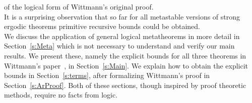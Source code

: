 of the logical form of Wittmann's original proof.\\
It is a surprising observation that so far for all metastable versions of strong ergodic theorems
primitive recursive bounds could be obtained.\\ 
We discuss the application of general logical metatheorems in more detail in Section~\ref{s:Meta} which is not
necessary to understand and verify our main results. We present these, namely the explicit bounds
for all three theorems in Wittmann's paper~\cite{Wittmann90}, in Section~\ref{s:Main}.
We explain how to obtain the explicit bounds in Section~\ref{s:terms},
after formalizing Wittmann's proof in Section~\ref{s:ArProof}. Both of these sections, though inspired by proof theoretic methods, 
require no facts from logic.
					

